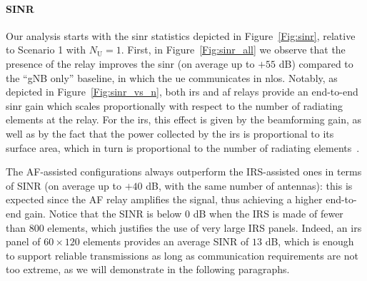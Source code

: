 \paragraph{SINR} Our analysis starts with the \gls{sinr} statistics depicted in Figure~\ref{Fig:sinr}, relative to Scenario 1 with $N_{\mathrm U}=1$.
First, in Figure~\ref{Fig:sinr_all} we observe that the presence of the relay improves the \gls{sinr} (on average up to $+55$ dB) compared to the ``gNB only'' baseline, in which the \gls{ue} communicates in \gls{nlos}. %
Notably, as depicted in Figure~\ref{Fig:sinr_vs_n}, both \gls{irs} and \gls{af} relays provide an end-to-end \gls{sinr} gain which scales proportionally 
with respect to the number of radiating elements at the relay. %
For the \gls{irs}, this effect is given by the beamforming gain, as well as by the fact that the power collected by the \gls{irs} is proportional to its surface area, which in turn is proportional to the number of radiating elements~\cite{bjornson2020reconfigurable}.

The AF-assisted configurations always outperform the IRS-assisted ones in terms of SINR (on average up to $+40$ dB, with the same number of antennas): this is expected since the AF relay amplifies the signal, thus achieving a higher end-to-end gain. 
Notice that the SINR is below 0 dB when the IRS is made of fewer than $800$ elements, which justifies the use of very large IRS panels. 
Indeed, an \gls{irs} panel of $60\times120$ elements provides an average SINR of $13$ dB, which is enough to support reliable transmissions as long as communication requirements are not too extreme, as we will demonstrate in the following paragraphs. 

